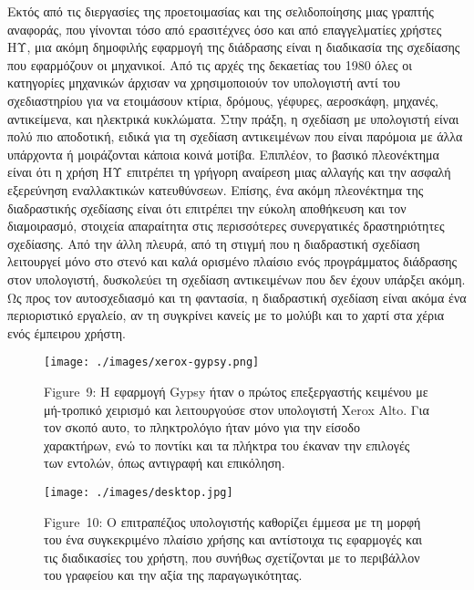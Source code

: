 \documentclass[
]{article}
\begin{document}
Εκτός από τις διεργασίες της προετοιμασίας και της σελιδοποίησης μιας
γραπτής αναφοράς, που γίνονται τόσο από ερασιτέχνες όσο και από
επαγγελματίες χρήστες ΗΥ, μια ακόμη δημοφιλής εφαρμογή της διάδρασης
είναι η διαδικασία της σχεδίασης που εφαρμόζουν οι μηχανικοί. Από τις
αρχές της δεκαετίας του 1980 όλες οι κατηγορίες μηχανικών άρχισαν να
χρησιμοποιούν τον υπολογιστή αντί του σχεδιαστηρίου για να ετοιμάσουν
κτίρια, δρόμους, γέφυρες, αεροσκάφη, μηχανές, αντικείμενα, και ηλεκτρικά
κυκλώματα. Στην πράξη, η σχεδίαση με υπολογιστή είναι πολύ πιο
αποδοτική, ειδικά για τη σχεδίαση αντικειμένων που είναι παρόμοια με
άλλα υπάρχοντα ή μοιράζονται κάποια κοινά μοτίβα. Επιπλέον, το βασικό
πλεονέκτημα είναι ότι η χρήση ΗΥ επιτρέπει τη γρήγορη αναίρεση μιας
αλλαγής και την ασφαλή εξερεύνηση εναλλακτικών κατευθύνσεων. Επίσης, ένα
ακόμη πλεονέκτημα της διαδραστικής σχεδίασης είναι ότι επιτρέπει την
εύκολη αποθήκευση και τον διαμοιρασμό, στοιχεία απαραίτητα στις
περισσότερες συνεργατικές δραστηριότητες σχεδίασης. Από την άλλη πλευρά,
από τη στιγμή που η διαδραστική σχεδίαση λειτουργεί μόνο στο στενό και
καλά ορισμένο πλαίσιο ενός προγράμματος διάδρασης στον υπολογιστή,
δυσκολεύει τη σχεδίαση αντικειμένων που δεν έχουν υπάρξει ακόμη. Ως προς
τον αυτοσχεδιασμό και τη φαντασία, η διαδραστική σχεδίαση είναι ακόμα
ένα περιοριστικό εργαλείο, αν τη συγκρίνει κανείς με το μολύβι και το
χαρτί στα χέρια ενός έμπειρου χρήστη.

\leavevmode{}%
\begin{figure}
\hypertarget{fig:xerox-gypsy}{%
\centering
\texttt{[image: ./images/xerox-gypsy.png]}
\caption{Figure~9: Η εφαρμογή Gypsy ήταν ο πρώτος επεξεργαστής κειμένου
με μή-τροπικό χειρισμό και λειτουργούσε στον υπολογιστή Xerox Alto. Για
τον σκοπό αυτο, το πληκτρολόγιο ήταν μόνο για την είσοδο χαρακτήρων, ενώ
το ποντίκι και τα πλήκτρα του έκαναν την επιλογές των εντολών, όπως
αντιγραφή και επικόληση.}\label{fig:xerox-gypsy}
}
\end{figure}

\leavevmode{}%
\begin{figure}
\hypertarget{fig:desktop}{%
\centering
\texttt{[image: ./images/desktop.jpg]}
\caption{Figure~10: Ο επιτραπέζιος υπολογιστής καθορίζει έμμεσα με τη
μορφή του ένα συγκεκριμένο πλαίσιο χρήσης και αντίστοιχα τις εφαρμογές
και τις διαδικασίες του χρήστη, που συνήθως σχετίζονται με το περιβάλλον
του γραφείου και την αξία της παραγωγικότητας.}\label{fig:desktop}
}
\end{figure}
\end{document}
